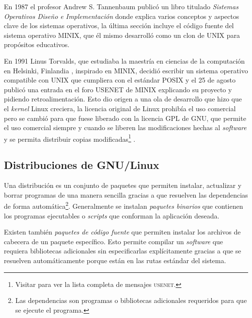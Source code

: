 En 1987 el profesor Andrew S. Tannenbaum public\'{o} un libro titulado \textit{Sistemas Operativos Dise\~{n}o e Implementaci\'{o}n} \cite{tanenbaum_operating_2006} donde explica varios conceptos y aspectos clave de los sistemas operativos, la \'{u}ltima secci\'{o}n incluye el c\'{o}digo fuente del sistema operativo \textsc{MINIX}, que \'{e}l mismo desarroll\'{o} como un clon de \textsc{UNIX} para prop\'{o}sitos educativos\cite{_complete_????}.

En 1991 Linus Torvalds, que estudiaba la maestr\'{i}a en ciencias de la computaci\'{o}n en Helsinki, Finlandia \cite{_staff_????}, inspirado en \textsc{MINIX}, decidi\'{o} escribir un sistema operativo compatible con UNIX que cumpliera con el est\'{a}ndar \textsc{POSIX} y el 25 de agosto public\'{o} una entrada en el foro \textsc{USENET} de \textsc{MINIX} \cite{_history_????} explicando su proyecto y pidiendo retroalimentaci\'{o}n. Esto dio origen a una ola de desarrollo que hizo que el \textsl{\gls{kernel}} Linux creciera, la licencia original de Linux prohib\'{i}a el uso comercial pero se cambi\'{o} para que fuese liberado con la licencia \textsc{\gls{GPL}} de \textsc{\gls{GNU}}, que permite el uso comercial siempre y cuando se liberen las modificaciones hechas al \emph{\gls{software}} y se permita distribuir copias modificadas\footnote{Visitar \cite{_linuxs_????} para ver la lista completa de mensajes \textsc{usenet}.} \cite{_linux_????-3}.

  \subsection {Distribuciones de GNU/Linux}

Una distribuci\'{o}n es un conjunto de paquetes que permiten instalar, actualizar y borrar programas de una manera sencilla gracias a que resuelven las dependencias de forma autom\'{a}tica\footnote{Las dependencias son programas o bibliotecas adicionales requeridos para que se ejecute el programa.}. Generalmente se instalan \textit{paquetes binarios} que contienen los programas ejecutables o \textit{scripts} que conforman la aplicaci\'{o}n deseada.

Existen tambi\'{e}n \textit{paquetes de c\'{o}digo fuente} que permiten instalar los archivos de cabecera de un paquete espec\'{i}fico. Esto permite compilar un \emph{\gls{software}} que requiera bibliotecas adicionales sin especificarlas expl\'{i}citamente gracias a que se resuelven autom\'{a}ticamente porque est\'{a}n en las rutas est\'{a}ndar del sistema.

